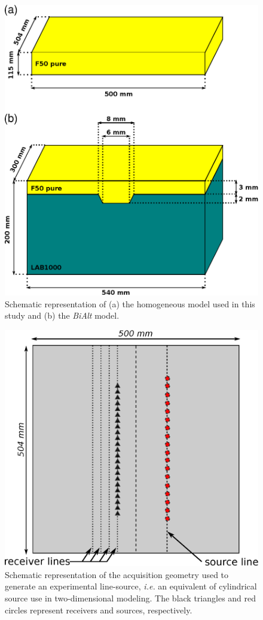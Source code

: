 \documentclass[extra,mreferee]{gji}
\newcommand{\bialt}{\textit{BiAlt} }
\begin{document}
\begin{figure}
\centering
\includegraphics[width=0.50\columnwidth]{Fig/Fig03.eps}
\caption{Schematic representation of (a) the homogeneous model used in this study and (b) the \bialt model.}
\label{Fig:Fig03}
\end{figure}

\clearpage
\newpage

\begin{figure}
\centering
\includegraphics[width=0.50\columnwidth]{Fig/Fig04.eps}
\caption{Schematic representation of the acquisition geometry used to generate an experimental line-source, \textit{i.e.} an equivalent of cylindrical source use in two-dimensional modeling. The black triangles and red circles represent receivers and sources, respectively.}
\label{Fig:Fig05}
\end{figure}

\clearpage
\newpage
\end{document}
